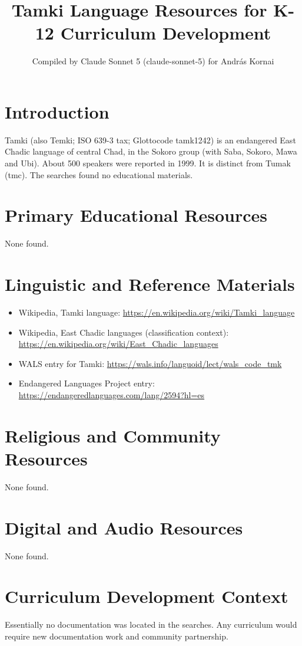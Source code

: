 \documentclass[12pt]{article}
\title{Tamki Language Resources for K-12 Curriculum Development}
\author{Compiled by Claude Sonnet 5 (claude-sonnet-5) for Andr\'as Kornai}
\date{}
\begin{document}
\maketitle
\section{Introduction}
Tamki (also Temki; ISO 639-3 tax; Glottocode tamk1242) is an endangered East Chadic language of central Chad, in the Sokoro group (with Saba, Sokoro, Mawa and Ubi). About 500 speakers were reported in 1999. It is distinct from Tumak (tmc). The searches found no educational materials.
\section{Primary Educational Resources}
None found.
\section{Linguistic and Reference Materials}
\begin{itemize}
\item Wikipedia, Tamki language: \url{https://en.wikipedia.org/wiki/Tamki_language}
\item Wikipedia, East Chadic languages (classification context): \url{https://en.wikipedia.org/wiki/East_Chadic_languages}
\item WALS entry for Tamki: \url{https://wals.info/languoid/lect/wals_code_tmk}
\item Endangered Languages Project entry: \url{https://endangeredlanguages.com/lang/2594?hl=es}
\end{itemize}
\section{Religious and Community Resources}
None found.
\section{Digital and Audio Resources}
None found.
\section{Curriculum Development Context}
Essentially no documentation was located in the searches. Any curriculum would require new documentation work and community partnership.
\end{document}
